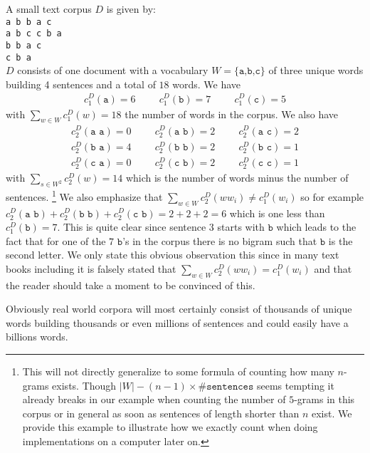 \documentclass[•]{book}
\begin{document}
\begin{example} A small text corpus $D$ is given by: \\
\texttt{a b b a c} \\
\texttt{a b c c b a} \\
\texttt{b b a c} \\
\texttt{c b a} \\
$D$ consists of one document with a vocabulary $W=\{\texttt{a,b,c}\}$ of three unique words building 4 sentences and a total of $18$ words. We have
\begin{align}
c_1^D(\texttt{a})=6 \hspace{1cm} c_1^D(\texttt{b})= 7 \hspace{1cm} c_1^D(\texttt{c})=5
\end{align}
with $\sum\limits_{w\in W}c_1^D(w) = 18$ the number of words in the corpus. We also have 
\begin{align*}
c_2^D(\texttt{a a})=0\hspace{1cm} c_2^D(\texttt{a b})=2\hspace{1cm}  c_2^D(\texttt{a c})=2 \\ 
c_2^D(\texttt{b a})=4\hspace{1cm} c_2^D(\texttt{b b})=2\hspace{1cm}  c_2^D(\texttt{b c})=1 \\
c_2^D(\texttt{c a})=0\hspace{1cm} c_2^D(\texttt{c b})=2\hspace{1cm}  c_2^D(\texttt{c c})=1 
\end{align*}
with $\sum\limits_{s\in W^2}c_2^D(w) = 14$ which is the number of words minus the number of sentences. \footnote{This will not directly generalize to some formula of counting how many $n$-grams exists. Though $|W| - (n-1)\times \texttt{\#sentences}$ seems tempting it already breaks in our example when counting the number of $5$-grams in this corpus or in general as soon as sentences of length shorter than $n$ exist. We provide this example to illustrate how we exactly count when doing implementations on a computer later on.} 
We also emphasize that $\sum_{w\in W}c_2^D(ww_i) \neq c_1^D(w_i)$ so for example $c_2^D(\texttt{a b}) + c_2^D(\texttt{b b})+ c_2^D(\texttt{c b}) = 2 + 2 + 2 = 6$ which is one less than $c_1^D(\texttt{b}) = 7$. This is quite clear since sentence $3$ starts with $\texttt{b}$ which leads to the fact that for one of the $7$ $\texttt{b}$'s in the corpus there is no bigram such that $\texttt{b}$ is the second letter. We only state this obvious observation this since in many text books including \cite{book:Jurafsky} it is falsely stated that $\sum_{w\in W}c_2^D(ww_i) = c_1^D(w_i)$ and that the reader should take a moment to be convinced of this.

Obviously real world corpora will most certainly consist of thousands of unique words building thousands or even millions of sentences and could easily have a billions words.
\end{example}
\end{document}
